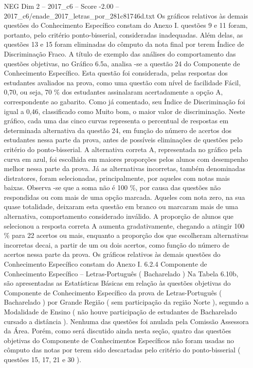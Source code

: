 \begin{textsample}{NEG Dim 2 – 2017\_c6 – Score -2.00 – 2017\_c6/enade\_2017\_letras\_por\_281c81746d.txt}
Os gráficos relativos às demais questões do Conhecimento Específico constam do Anexo I. questões 9 e 11 foram, portanto, pelo critério ponto-bisserial, consideradas inadequadas.
Além delas, as questões 13 e 15 foram eliminadas do cômputo da nota final por terem Índice de Discriminação Fraco.
A título de exemplo das análises do comportamento das questões objetivas, no Gráfico 6.5a, analisa -se a questão 24 do Componente de Conhecimento Específico.
Esta questão foi considerada, pelas respostas dos estudantes avaliados na prova, como uma questão com nível de facilidade Fácil, 0,70, ou seja, 70 \% dos estudantes assinalaram acertadamente a opção A, correspondente ao gabarito.
Como já comentado, seu Índice de Discriminação foi igual a 0,46, classificado como Muito bom, o maior valor de discriminação.
Neste gráfico, cada uma das cinco curvas representa o percentual de respostas em determinada alternativa da questão 24, em função do número de acertos dos estudantes nessa parte da prova, antes de possíveis eliminações de questões pelo critério do ponto-bisserial.
A alternativa correta A, representada no gráfico pela curva em azul, foi escolhida em maiores proporções pelos alunos com desempenho melhor nessa parte da prova.
Já as alternativas incorretas, também denominadas distratores, foram selecionadas, principalmente, por aqueles com notas mais baixas.
Observa -se que a soma não é 100 \%, por causa das questões não respondidas ou com mais de uma opção marcada.
Aqueles com nota zero, na sua quase totalidade, deixaram esta questão em branco ou marcaram mais de uma alternativa, comportamento considerado inválido.
A proporção de alunos que selecionou a resposta correta A aumenta gradativamente, chegando a atingir 100 \% para 22 acertos ou mais, enquanto a proporção dos que escolheram alternativas incorretas decai, a partir de um ou dois acertos, como função do número de acertos nessa parte da prova.
Os gráficos relativos às demais questões do Conhecimento Específico constam do Anexo I. 6.2.4 Componente de Conhecimento Específico – Letras-Português ( Bacharelado ) Na Tabela 6.10b, são apresentadas as Estatísticas Básicas em relação às questões objetivas do Componente de Conhecimento Específico da prova de Letras-Português ( Bacharelado ) por Grande Região ( sem participação da região Norte ), segundo a Modalidade de Ensino ( não houve participação de estudantes de Bacharelado cursado a distância ).
Nenhuma das questões foi anulada pela Comissão Assessora da Área.
Porém, como será discutido ainda nesta seção, quatro das questões objetivas do Componente de Conhecimentos Específicos não foram usadas no cômputo das notas por terem sido descartadas pelo critério do ponto-bisserial ( questões 15, 17, 21 e 30 ).

\end{textsample}

